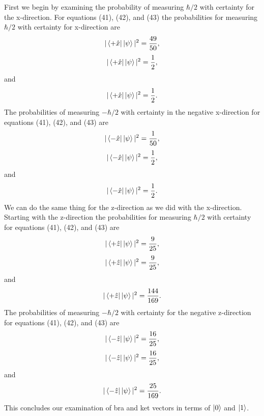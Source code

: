 \documentclass[twocolumn]{article}
\begin{document}
First we begin by examining the probability of measuring $\hbar/2$ with certainty for the x-direction. For equations (41), (42), and (43) the probabilities for measuring $\hbar/2$ with certainty for x-direction are
\begin{equation}
|\bra{+\hat{x}}\ket{\psi}|^2=\frac{49}{50},
\end{equation}
\begin{equation}
|\bra{+\hat{x}}\ket{\psi}|^2=\frac{1}{2},
\end{equation}
and
\begin{equation}
|\bra{+\hat{x}}\ket{\psi}|^2=\frac{1}{2}.
\end{equation}
The probabilities of measuring $-\hbar/2$ with certainty in the negative x-direction for equations (41), (42), and (43) are
\begin{equation}
|\bra{-\hat{x}}\ket{\psi}|^2=\frac{1}{50},
\end{equation}
\begin{equation}
|\bra{-\hat{x}}\ket{\psi}|^2=\frac{1}{2},
\end{equation}
and
\begin{equation}
|\bra{-\hat{x}}\ket{\psi}|^2=\frac{1}{2}.
\end{equation}
We can do the same thing for the z-direction as we did with the x-direction. Starting with the z-direction the probabilities for measuring $\hbar/2$ with certainty for equations (41), (42), and (43) are
\begin{equation}
|\bra{+\hat{z}}\ket{\psi}|^2=\frac{9}{25},
\end{equation}
\begin{equation}
|\bra{+\hat{z}}\ket{\psi}|^2=\frac{9}{25},
\end{equation}
and
\begin{equation}
|\bra{+\hat{z}}\ket{\psi}|^2=\frac{144}{169}.
\end{equation}
The probabilities of measuring $-\hbar/2$ with certainty for the negative z-direction for equations (41), (42), and (43) are
\begin{equation}
|\bra{-\hat{z}}\ket{\psi}|^2=\frac{16}{25},
\end{equation}
\begin{equation}
|\bra{-\hat{z}}\ket{\psi}|^2=\frac{16}{25},
\end{equation}
and
\begin{equation}
|\bra{-\hat{z}}\ket{\psi}|^2=\frac{25}{169}.
\end{equation}
This concludes our examination of bra and ket vectors in terms of $\ket{0}$ and $\ket{1}$.
\end{document}
